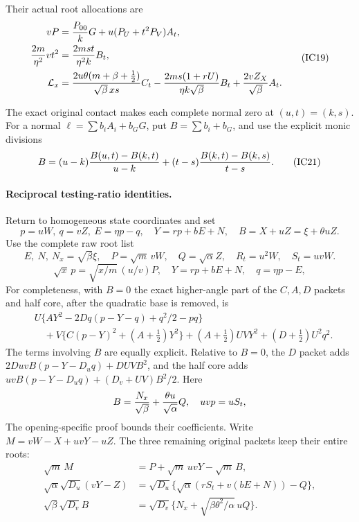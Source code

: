 Their actual root allocations are
\[
\begin{aligned}
 vP&={P_{00}\over k}G+u(P_U+t^2P_V)A_t,\\
 {2m\over\eta^2}vt^2&={2ms t\over\eta^2k}B_t,\\
 \mathcal L_x&={2u\theta(m+\beta+\tfrac12)
                    \over\sqrt\beta\,xs}C_t
 -{2ms(1+rU)\over\eta k\sqrt\beta}B_t
 +{2vZ_X\over\sqrt\beta}A_t.                          \end{aligned} \tag{IC19}
\]

The exact original contact makes each complete normal zero at
$(u,t)=(k,s)$. For a normal $\ell=\sum b_iA_i+b_GG$, put
$B=\sum b_i+b_G$, and use the explicit monic divisions
\[
 B=(u-k){B(u,t)-B(k,t)\over u-k}
       +(t-s){B(k,t)-B(k,s)\over t-s}.                 \tag{IC21}
\]

\paragraph{Reciprocal testing-ratio identities.}
Return to homogeneous state coordinates and set
\[
 p=uW,\ q=vZ,\ E=\eta p-q,\quad
 Y=rp+bE+N,\quad B=X+uZ=\xi+\theta uZ.
\]
Use the complete raw root list
\[
 E,\ N,\ N_x=\sqrt\beta\xi,\quad
 P=\sqrt m\,vW,\quad Q=\sqrt\alpha Z,\quad
 R_t=u^2W,\quad S_t=uvW.                              \tag{IC22}
\]
\[
 \sqrt x\,p=\sqrt{x/m}\,(u/v)P,\quad
 Y=rp+bE+N,\quad q=\eta p-E,                          \tag{IC23}
\]
For completeness, with $B=0$ the exact higher-angle part of the
$C,A,D$ packets and half core, after the quadratic base is removed, is
\[
\begin{split}
 &U\{AY^2-2Dq(p-Y-q)+q^2/2-pq\}\\
 &\quad+V\{C(p-Y)^2+(A+\tfrac12)Y^2\}
 +(A+\tfrac12)UVY^2+(D+\tfrac12)U^2q^2.               \end{split} \tag{IC24}
\]
The terms involving $B$ are equally explicit. Relative to $B=0$, the
$D$ packet adds $2DuvB(p-Y-D_uq)+DUVB^2$, and the half core adds
$uvB(p-Y-D_uq)+(D_v+UV)B^2/2$.
Here
\[
 B={N_x\over\sqrt\beta}+{\theta u\over\sqrt\alpha}Q,
 \quad uvp=uS_t,
\]
The opening-specific proof bounds their coefficients.  Write
$M=vW-X+uvY-uZ$. The three remaining
original packets keep their entire roots:
\[
\begin{aligned}
 \sqrt m\,M&=P+\sqrt m\,uvY-\sqrt m\,B,\\
 \sqrt\alpha\sqrt{D_u}(vY-Z)
  &=\sqrt{D_u}\{\sqrt\alpha(rS_t+v(bE+N))-Q\},\\
 \sqrt\beta\sqrt{D_v}B
  &=\sqrt{D_v}\{N_x+\sqrt{\beta\theta^2/\alpha}\,uQ\}.
\end{aligned}                                                   \tag{IC26}
\]


